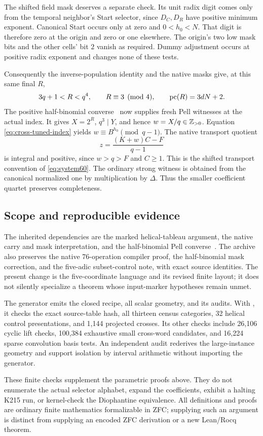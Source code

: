 The shifted field mask deserves a separate check. Its unit radix
digit comes only from the temporal neighbor's Start selector,
since \(D_C,D_R\) have positive minimum exponent. Canonical Start
occurs only at zero and \(0<h_0<N\). That digit is therefore zero
at the origin and zero or one elsewhere. The origin's two low
mask bits and the other cells' bit \(2\) vanish as required.
Dummy adjustment occurs at positive radix exponent and changes
none of these tests.

Consequently the inverse-population identity and the native masks
give, at this same final \(R\),
\[
 3q+1<R<q^4,\qquad
 R\equiv3\pmod4,\qquad
 \operatorname{pc}(R)=3dN+2.
\]
The positive half-binomial converse~\cite{halfbinomial,blank06}
now supplies fresh Pell witnesses at the actual index.
It gives \(X=2^R\), \(q^3\mid Y\), and hence \(w=X/q\in\mathbb Z_{>0}\).
Equation \eqref{eq:cross-tuned-index} yields
\(w\equiv B^{h_0}\pmod{q-1}\). The native transport quotient
\[
 z=\frac{(K+w)C-F}{q-1}
\]
is integral and positive, since \(w>q>F\) and \(C\ge1\).
This is the shifted transport convention of
\eqref{eq:system60}. The ordinary strong witness is obtained
from the canonical normalized one by multiplication by \(\Delta\).
Thus the smaller coefficient quartet preserves completeness.

\subsection{Scope and reproducible evidence}

The inherited dependencies are the marked helical-tableau argument,
the native carry and mask interpretation, and the half-binomial
Pell converse~\cite{blank06,raw75,halfbinomial}. The archive also
preserves the native 76-operation compiler proof, the half-binomial
mask correction, and the five-adic subset-control note, with exact
source identities. The present change is the five-coordinate
language and its revised finite layout; it does not silently
specialize a theorem whose input-marker hypotheses remain unmet.

The generator  emits the closed
recipe, all scalar geometry, and its audits. With , it
checks the exact source-table hash, all thirteen census categories,
32 helical control presentations, and 1,144 projected crosses.
Its other checks include 26,106 cyclic lift checks, 100,384 exhaustive
small cross-word candidates, and 16,224 sparse convolution basis
tests. An independent audit rederives the large-instance geometry
and support isolation by interval arithmetic without importing the
generator.

These finite checks supplement the parametric proofs above.
They do not enumerate the actual selector alphabet, expand the
coefficients, exhibit a halting K215 run, or kernel-check the
Diophantine equivalence. All definitions and proofs are ordinary
finite mathematics formalizable in ZFC; supplying such an argument
is distinct from supplying an encoded ZFC derivation or a new
Lean/Rocq theorem.

